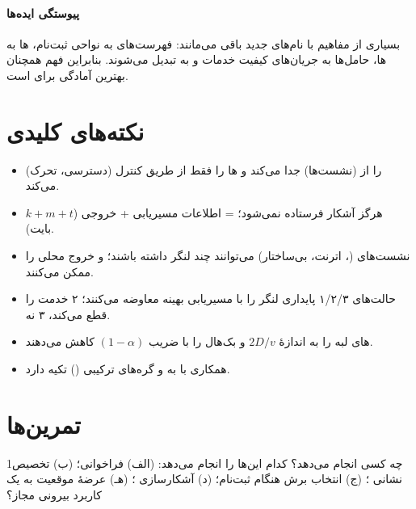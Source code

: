 \documentclass[11pt,a4paper]{article}
\begin{document}
\paragraph{پیوستگی ایده‌ها} بسیاری از مفاهیم  با نام‌های جدید باقی می‌مانند: فهرست‌های  به نواحی ثبت‌نام،
ها به ها، حامل‌ها به جریان‌های کیفیت خدمات و  به  تبدیل می‌شوند. بنابراین فهم
 همچنان بهترین آمادگی برای  است.

\section{نکته‌های کلیدی}
\begin{takeawaybox}
\begin{itemize}
  \item {}  (دسترسی، تحرک) را از  (نشست‌ها) جدا می‌کند و ها را فقط از طریق  کنترل
        می‌کند.
  \item {} هرگز آشکار فرستاده نمی‌شود؛  = اطلاعات مسیریابی + خروجی  ($k + m + t$ بایت).
  \item نشست‌های  (، اترنت، بی‌ساختار) می‌توانند چند لنگر داشته باشند؛  و  خروج محلی را ممکن
        می‌کنند.
  \item حالت‌های  ۱/۲/۳ پایداری لنگر را با مسیریابی بهینه معاوضه می‌کنند؛  ۲ خدمت را قطع می‌کند،  ۳ نه.
  \item {}های لبه  را به اندازهٔ $2D/v$ و بک‌هال را با ضریب $(1-\alpha)$ کاهش می‌دهند.
  \item همکاری با  به  و گره‌های ترکیبی () تکیه دارد.
\end{itemize}
\end{takeawaybox}

\section{تمرین‌ها}

\begin{exercisebox}{1}{چه کسی انجام می‌دهد؟}\label{exr:who}
کدام  این‌ها را انجام می‌دهد: (الف) فراخوانی؛ (ب) تخصیص نشانی ؛ (ج) انتخاب برش هنگام ثبت‌نام؛ (د) آشکارسازی
؛ (هـ) عرضهٔ موقعیت  به یک کاربرد بیرونی مجاز؟
\end{exercisebox}
\end{document}
